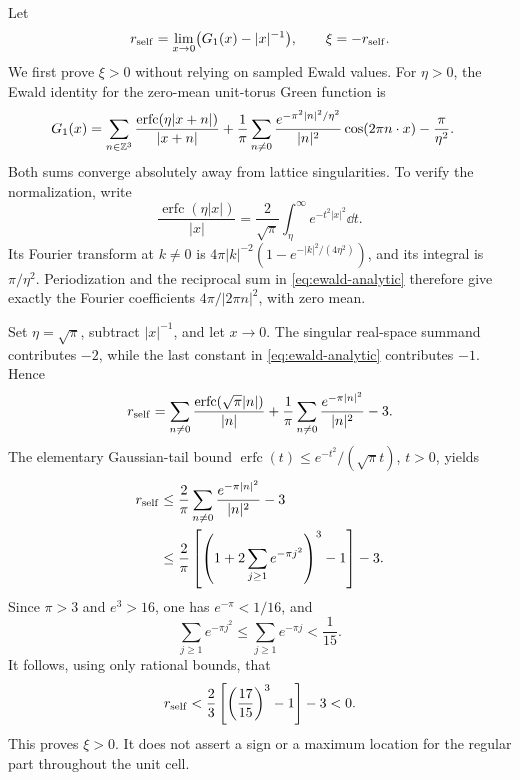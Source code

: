 \begin{remark}
\label{rem:madelung}
Let
\[
 r_{\rm self}=\lim_{x\to0}\bigl(G_1(x)-|x|^{-1}\bigr),\qquad
 \xi=-r_{\rm self}.
\]
We first prove \(\xi>0\) without relying on sampled Ewald values.
For \(\eta>0\), the Ewald identity for the zero-mean unit-torus Green
function is
\begin{align}
 G_1(x)
 &=\sum_{n\in\mathbb Z^3}\frac{\operatorname{erfc}(\eta|x+n|)}{|x+n|}
   +\frac1\pi\sum_{n\ne0}
       \frac{e^{-\pi^2|n|^2/\eta^2}}{|n|^2}
                  \cos(2\pi n\cdot x)-\frac\pi{\eta^2}.
 \label{eq:ewald-analytic}
\end{align}
Both sums converge absolutely away from lattice singularities. To verify
the normalization, write
\[
 \frac{\operatorname{erfc}(\eta|x|)}{|x|}
 =\frac2{\sqrt\pi}\int_\eta^\infty e^{-t^2|x|^2}\dd t.
\]
Its Fourier transform at \(k\ne0\) is
\(4\pi|k|^{-2}(1-e^{-|k|^2/(4\eta^2)})\), and its integral is
\(\pi/\eta^2\). Periodization and the reciprocal sum in
\eqref{eq:ewald-analytic} therefore give exactly the Fourier coefficients
\(4\pi/|2\pi n|^2\), with zero mean.

Set \(\eta=\sqrt\pi\), subtract \(|x|^{-1}\), and let \(x\to0\).
The singular real-space summand contributes \(-2\), while the last
constant in \eqref{eq:ewald-analytic} contributes \(-1\). Hence
\begin{equation}
 r_{\rm self}
 =\sum_{n\ne0}\frac{\operatorname{erfc}(\sqrt\pi|n|)}{|n|}
  +\frac1\pi\sum_{n\ne0}\frac{e^{-\pi|n|^2}}{|n|^2}-3.
 \label{eq:madelung-sign}
\end{equation}
The elementary Gaussian-tail bound
\(\operatorname{erfc}(t)\leq e^{-t^2}/(\sqrt\pi t)\), \(t>0\), yields
\begin{align*}
 r_{\rm self}
 &\leq\frac2\pi\sum_{n\ne0}\frac{e^{-\pi|n|^2}}{|n|^2}-3\\
 &\leq\frac2\pi
   \left[\left(1+2\sum_{j\geq1}e^{-\pi j^2}\right)^3-1\right]-3.
\end{align*}
Since \(\pi>3\) and \(e^3>16\), one has \(e^{-\pi}<1/16\), and
\[
 \sum_{j\geq1}e^{-\pi j^2}
 \leq\sum_{j\geq1}e^{-\pi j}<\frac1{15}.
\]
It follows, using only rational bounds, that
\[
 r_{\rm self}
 <\frac23\left[\left(\frac{17}{15}\right)^3-1\right]-3<0.
\]
This proves \(\xi>0\). It does not assert a sign or a maximum location for
the regular part throughout the unit cell.


\end{remark}
